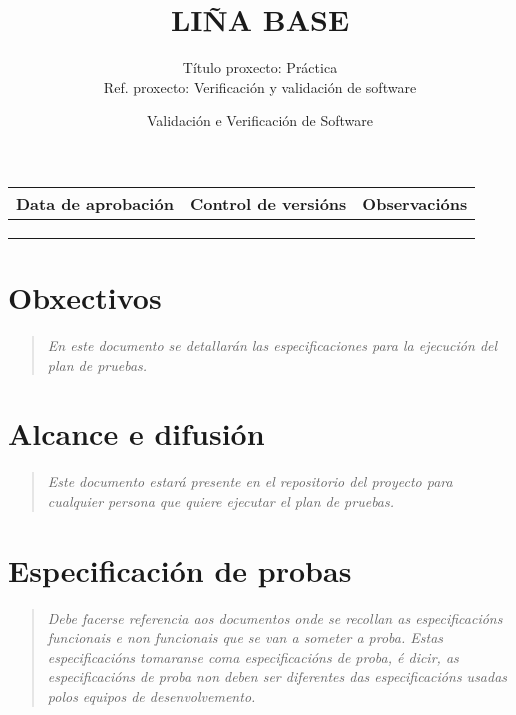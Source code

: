 \documentclass[DIV=calc,paper=a4,fontsize=11pt,onecolumn]{scrartcl}	 %
\title{LIÑA BASE} %
\author{Título proxecto: Práctica \\
	Ref. proxecto: Verificación y validación de software}
\date{\sffamily Validación e Verificación de Software} %
\newcommand{\hint}[1]{\begin{quote}\itshape #1 \end{quote}}
\begin{document}
\maketitle %
\thispagestyle{fancy} %


\vspace*{1cm}

\begin{center}
\small \sffamily
\begin{tabular}{c|c|c}
Data de aprobación & Control de versións & Observacións \\ \hline
& & \\ \hline
& & \\ \hline
& & \\
\end{tabular}
\end{center}

\clearpage


\section{Obxectivos}

\hint{En este documento se detallarán las especificaciones para la ejecución del plan de pruebas.}

\section{Alcance e difusión}

\hint{Este documento estará presente en el repositorio del proyecto para cualquier persona que quiere ejecutar el plan de pruebas.}

\section{Especificación de probas}

\hint{Debe facerse referencia aos documentos onde se recollan as especificacións
  funcionais e non funcionais que se van a someter a proba. Estas
  especificacións tomaranse coma especificacións de proba, é dicir, as
  especificacións de proba non deben ser diferentes das especificacións usadas
  polos equipos de desenvolvemento.}
\end{document}

